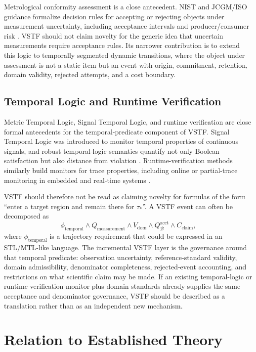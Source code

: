 \documentclass[11pt,a4paper]{article}
\newcommand{\1}{\mathbf{1}}
\begin{document}
Metrological conformity assessment is a close antecedent. NIST and JCGM/ISO guidance formalize decision rules for accepting or rejecting objects under measurement uncertainty, including acceptance intervals and producer/consumer risk \cite{phillips2014,jcgm106}. VSTF should not claim novelty for the generic idea that uncertain measurements require acceptance rules. Its narrower contribution is to extend this logic to temporally segmented dynamic transitions, where the object under assessment is not a static item but an event with origin, commitment, retention, domain validity, rejected attempts, and a cost boundary.

\subsection{Temporal Logic and Runtime Verification}

Metric Temporal Logic, Signal Temporal Logic, and runtime verification are close formal antecedents for the temporal-predicate component of VSTF. Signal Temporal Logic was introduced to monitor temporal properties of continuous signals, and robust temporal-logic semantics quantify not only Boolean satisfaction but also distance from violation \cite{maler2004,fainekos2009}. Runtime-verification methods similarly build monitors for trace properties, including online or partial-trace monitoring in embedded and real-time systems \cite{reinbacher2014rv}.

VSTF should therefore not be read as claiming novelty for formulas of the form ``enter a target region and remain there for $\tau_\ast$''. A VSTF event can often be decomposed as
\[
  \phi_{\mathrm{temporal}}
  \wedge Q_{\mathrm{measurement}}
  \wedge V_{\mathrm{dom}}
  \wedge Q_{\mathcal{B}}^{\mathrm{acct}}
  \wedge C_{\mathrm{claim}},
\]
where $\phi_{\mathrm{temporal}}$ is a trajectory requirement that could be expressed in an STL/MTL-like language. The incremental VSTF layer is the governance around that temporal predicate: observation uncertainty, reference-standard validity, domain admissibility, denominator completeness, rejected-event accounting, and restrictions on what scientific claim may be made. If an existing temporal-logic or runtime-verification monitor plus domain standards already supplies the same acceptance and denominator governance, VSTF should be described as a translation rather than as an independent new mechanism.

\section{Relation to Established Theory}
\end{document}
